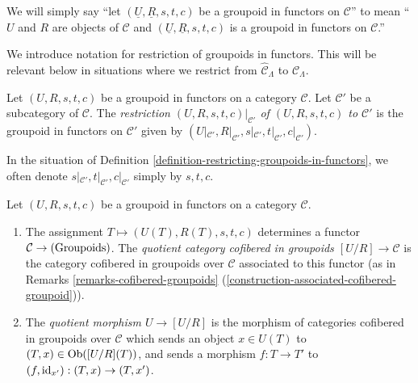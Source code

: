 \begin{remark}
We will simply say ``let $(\underline{U}, \underline{R}, s,t,c)$ be a groupoid 
in functors on $\mathcal C$'' to mean ``$U$ and $R$ are objects of $\mathcal C$ 
and $(\underline{U}, \underline{R}, s,t,c)$ is a groupoid in functors on 
$\mathcal C$.''
\end{remark}

\noindent
We introduce notation for restriction of groupoids in functors. This will be 
relevant below in situations where we restrict from $\widehat{\mathcal 
C}_{\Lambda}$ to $\mathcal C_{\Lambda}$.
\begin{definition}
\label{definition-restricting-groupoids-in-functors}
Let $(U,R,s,t,c)$ be a groupoid in functors on a category $\mathcal C$.  Let 
$\mathcal C'$ be a subcategory of $\mathcal C$.  The \emph{restriction 
$(U,R,s,t,c)|_{\mathcal C'}$ of $(U,R,s,t,c)$ to $\mathcal C'$} is the groupoid 
in functors on $\mathcal C'$ given by $(U|_{\mathcal C'},R|_{\mathcal 
C'},s|_{\mathcal C'},t|_{\mathcal C'},c|_{\mathcal C'})$.
\end{definition}

\begin{remark}
In the situation of Definition 
\ref{definition-restricting-groupoids-in-functors}, we often denote 
$s|_{\mathcal C'},t|_{\mathcal C'},c|_{\mathcal C'}$ simply by $s,t,c$.
\end{remark}

\begin{definition}
Let $(U,R,s,t,c)$ be a groupoid in functors on a category $\mathcal C$. 
\begin{enumerate}
\item The assignment $T \mapsto  (U(T), R(T), s,t,c)$ determines a functor 
$\mathcal C \rightarrow \textnormal{(Groupoids)}$. The \emph{quotient category 
cofibered in groupoids $[U/R] \rightarrow \mathcal C$} is the category 
cofibered in groupoids over $\mathcal C$ associated to this functor (as in 
Remarks \ref{remarks-cofibered-groupoids} 
(\ref{construction-associated-cofibered-groupoid})).  
\item The \emph{quotient morphism $U \rightarrow [U/R]$} is the morphism of 
categories cofibered in groupoids over $\mathcal C$ which sends an object $x 
\in U(T)$ to $(T,x) \in \textnormal{Ob}([U/R](T))$, and sends a morphism $f: T 
\rightarrow T'$ to $(f, \textnormal{id}_{x'}): (T,x) \rightarrow (T,x')$.
\end{enumerate} 
\end{definition}

